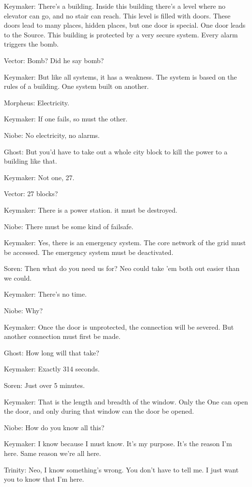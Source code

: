 \documentclass{ctexart}
\newenvironment{myquote}{\color{green} \setlength{\leftskip}{6em} \setlength{\rightskip}{4em} \setlength{\parindent}{-2em}}{\par}
\begin{document}
\begin{myquote}
Keymaker: There's a building. Inside this building there's a level where no elevator can go, and no stair can reach. This level is filled with doors. These doors lead to many places, hidden places, but one door is special. One door leads to the Source. This building is protected by a very secure system. Every alarm triggers the bomb.

Vector: Bomb? Did he say bomb?

Keymaker: But like all systems, it has a weakness. The system is based on the rules of a building. One system built on another.

Morpheus: Electricity.

Keymaker: If one fails, so must the other.

Niobe: No electricity, no alarms.

Ghost: But you'd have to take out a whole city block to kill the power to a building like that.

Keymaker: Not one, 27.

Vector: 27 blocks?

Keymaker: There is a power station. it must be destroyed.

Niobe: There must be some kind of failsafe.

Keymaker: Yes, there is an emergency system. The core network of the grid must be accessed. The emergency system must be deactivated.

Soren: Then what do you need us for? Neo could take 'em both out easier than we could.

Keymaker: There's no time.

Niobe: Why?

Keymaker: Once the door is unprotected, the connection will be severed. But another connection must first be made.

Ghost: How long will that take?

Keymaker: Exactly 314 seconds.

Soren: Just over 5 minutes.

Keymaker: That is the length and breadth of the window. Only the One can open the door, and only during that window can the door be opened.

Niobe: How do you know all this?

Keymaker: I know because I must know. It's my purpose. It's the reason I'm here. Same reason we're all here.

Trinity: Neo, I know something's wrong. You don't have to tell me. I just want you to know that I'm here.


\end{myquote}
\end{document}
